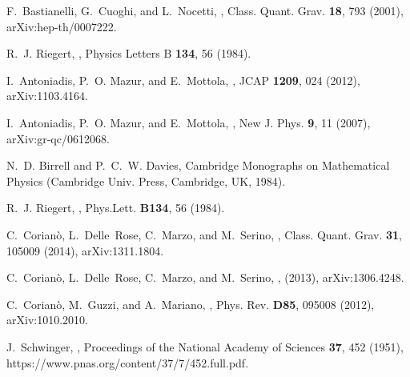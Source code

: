\documentclass[a4paper,11pt,openright,twoside]{book}
\numberwithin{equation}{section}
\begin{document}
{{\begin{thebibliography}{100}
	F.~Bastianelli, G.~Cuoghi, and L.~Nocetti,
	,
	\newblock Class. Quant. Grav. {\bf 18}, 793 (2001), arXiv:hep-th/0007222.
	
	R.~J. {Riegert},
	,
	\newblock Physics Letters B {\bf 134}, 56 (1984).
	
	I.~Antoniadis, P.~O. Mazur, and E.~Mottola,
	,
	\newblock JCAP {\bf 1209}, 024 (2012), arXiv:1103.4164.
	
	I.~Antoniadis, P.~O. Mazur, and E.~Mottola,
	,
	\newblock New J. Phys. {\bf 9}, 11 (2007), arXiv:gr-qc/0612068.
	
	N.~D. Birrell and P.~C.~W. Davies,
	Cambridge Monographs on
	Mathematical Physics (Cambridge Univ. Press, Cambridge, UK, 1984).
	
	R.~J. Riegert,
	,
	\newblock Phys.Lett. {\bf B134}, 56 (1984).
	
	C.~Corian\`o, L.~Delle~Rose, C.~Marzo, and M.~Serino,
	,
	\newblock Class. Quant. Grav. {\bf 31}, 105009 (2014), arXiv:1311.1804.
	
	C.~Corian\`o, L.~Delle~Rose, C.~Marzo, and M.~Serino,
	,
	\newblock (2013), arXiv:1306.4248.
	
	C.~Corian\`o, M.~Guzzi, and A.~Mariano,
	,
	\newblock Phys. Rev. {\bf D85}, 095008 (2012), arXiv:1010.2010.
	
	J.~Schwinger,
	,
	\newblock Proceedings of the National Academy of Sciences {\bf 37}, 452 (1951),
	https://www.pnas.org/content/37/7/452.full.pdf.
	

\end{thebibliography}}}
\end{document}
